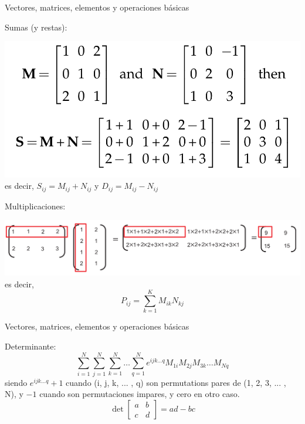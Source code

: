 \documentclass[aspectratio=169]{beamer}
\begin{document}
\begin{frame}
 {Vectores, matrices, elementos y operaciones b\'asicas}

 \vskip 0cm
 Sumas (y restas): 
 \begin{center}  
 \vskip -1cm
 \includegraphics[width=0.5\linewidth]{images/sum_matrix.png} \\ \pause
 es decir, $S_{ij} = M_{ij} + N_{ij}$ \quad y \quad $D_{ij} = M_{ij} - N_{ij}$
 \end{center}
 \pause
\vskip -0.3cm Multiplicaciones: \pause
 \begin{center}
 \vskip -0.4cm \includegraphics[width=0.9\linewidth]{images/multiplication.png} \\ \pause
 \vskip -1.2cm es decir,
 \vskip -0.8cm \begin{equation*}
  P_{ij} = \sum^{K}_{k=1} M_{ik}N_{kj}
 \end{equation*}
 \end{center}

\end{frame}

\begin{frame}
 {Vectores, matrices, elementos y operaciones b\'asicas}
 
 Determinante: \pause
 \begin{equation*}
  \sum^N_{i=1}  \sum^N_{j=1}  \sum^N_{k=1} \dots \sum^N_{q=1} e^{ijk\dots q} M_{1i} M_{2j} M_{3k} \dots M_{Nq}
 \end{equation*} 
siendo $e^{ijk\dots q} +1$ cuando (i, j, k, ... , q) son permutations pares de (1, 2, 3, ... , N), y $-1$ cuando son permutaciones impares, y cero en otro caso.
 \pause
 \begin{equation*}
  \det{\begin{bmatrix}
        a & b \\
        c & d 
       \end{bmatrix}} = ad - bc
 \end{equation*}

 
\end{frame}
\end{document}
